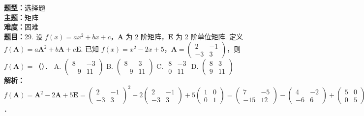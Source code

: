 \documentclass{ctexart}
\newenvironment{question}[5]{%
	\noindent\textbf{题型：}#1\\
	\textbf{主题：}#2\\
	\textbf{难度：}#3\\
	\textbf{题目：}#4\\
	\textbf{解析：}#5\\
	\vspace{1em}
}{}
\begin{document}
	\begin{question}
		{选择题}
		{矩阵}
		{困难}
		{29. 设 \(f(x)=a x^2+b x+c\)，\(\mathbf{A}\) 为 2 阶矩阵，\(\mathbf{E}\) 为 2 阶单位矩阵. 定义 \(f(\mathbf{A})=a \mathbf{A}^2+b \mathbf{A}+c \mathbf{E}\). 已知 \(f(x)=x^2-2 x+5\)，\(\mathbf{A}=\left(\begin{array}{cc}2 & -1 \\ -3 & 3\end{array}\right)\)，则 \(f(\mathbf{A})=\)（）．
			A. \(\left(\begin{array}{cc}8 & -3 \\ -9 & 11\end{array}\right)\)
			B. \(\left(\begin{array}{cc}8 & 3 \\ -9 & 11\end{array}\right)\)
			C. \(\begin{array}{rr}8 & -3 \\ 0 & 11\end{array}\)
			D. \(\left(\begin{array}{cc}8 & 3 \\ 9 & 11\end{array}\right)\)}
		{\(f(\mathbf{A})=\mathbf{A}^2-2 \mathbf{A}+5 \mathbf{E}=\left(\begin{array}{cc}2 & -1 \\ -3 & 3\end{array}\right)^2-2\left(\begin{array}{cc}2 & -1 \\ -3 & 3\end{array}\right)+5\left(\begin{array}{ll}1 & 0 \\ 0 & 1\end{array}\right)=\left(\begin{array}{cc}7 & -5 \\ -15 & 12\end{array}\right)-\left(\begin{array}{cc}4 & -2 \\ -6 & 6\end{array}\right)+\left(\begin{array}{cc}5 & 0 \\ 0 & 5\end{array}\right)=\left(\begin{array}{cc}8 & -3 \\ -9 & 11\end{array}\right)\)．}
	\end{question}
	
\end{document}
